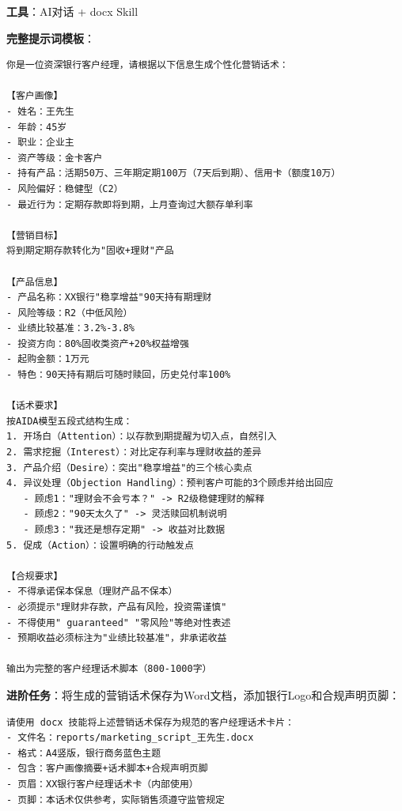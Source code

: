\begin{practicebox}[实操：智能营销话术生成]
\textbf{工具}：AI对话 + docx Skill

\textbf{完整提示词模板}：

\begin{lstlisting}
你是一位资深银行客户经理，请根据以下信息生成个性化营销话术：

【客户画像】
- 姓名：王先生
- 年龄：45岁
- 职业：企业主
- 资产等级：金卡客户
- 持有产品：活期50万、三年期定期100万（7天后到期）、信用卡（额度10万）
- 风险偏好：稳健型（C2）
- 最近行为：定期存款即将到期，上月查询过大额存单利率

【营销目标】
将到期定期存款转化为"固收+理财"产品

【产品信息】
- 产品名称：XX银行"稳享增益"90天持有期理财
- 风险等级：R2（中低风险）
- 业绩比较基准：3.2%-3.8%
- 投资方向：80%固收类资产+20%权益增强
- 起购金额：1万元
- 特色：90天持有期后可随时赎回，历史兑付率100%

【话术要求】
按AIDA模型五段式结构生成：
1. 开场白（Attention）：以存款到期提醒为切入点，自然引入
2. 需求挖掘（Interest）：对比定存利率与理财收益的差异
3. 产品介绍（Desire）：突出"稳享增益"的三个核心卖点
4. 异议处理（Objection Handling）：预判客户可能的3个顾虑并给出回应
   - 顾虑1："理财会不会亏本？" -> R2级稳健理财的解释
   - 顾虑2："90天太久了" -> 灵活赎回机制说明
   - 顾虑3："我还是想存定期" -> 收益对比数据
5. 促成（Action）：设置明确的行动触发点

【合规要求】
- 不得承诺保本保息（理财产品不保本）
- 必须提示"理财非存款，产品有风险，投资需谨慎"
- 不得使用" guaranteed" "零风险"等绝对性表述
- 预期收益必须标注为"业绩比较基准"，非承诺收益

输出为完整的客户经理话术脚本（800-1000字）
\end{lstlisting}

\textbf{进阶任务}：将生成的营销话术保存为Word文档，添加银行Logo和合规声明页脚：

\begin{lstlisting}
请使用 docx 技能将上述营销话术保存为规范的客户经理话术卡片：
- 文件名：reports/marketing_script_王先生.docx
- 格式：A4竖版，银行商务蓝色主题
- 包含：客户画像摘要+话术脚本+合规声明页脚
- 页眉：XX银行客户经理话术卡（内部使用）
- 页脚：本话术仅供参考，实际销售须遵守监管规定
\end{lstlisting}
\end{practicebox}

